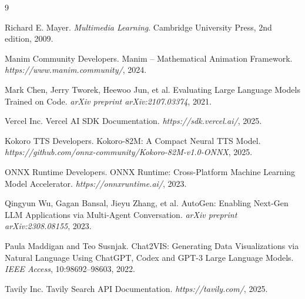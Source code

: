\documentclass[12pt,a4paper,twoside,openright]{report}
\begin{document}
\begin{thebibliography}{9}

Richard E. Mayer.
\emph{Multimedia Learning}.
Cambridge University Press, 2nd edition, 2009.

Manim Community Developers.
Manim -- Mathematical Animation Framework.
\emph{https://www.manim.community/}, 2024.

Mark Chen, Jerry Tworek, Heewoo Jun, et al.
Evaluating Large Language Models Trained on Code.
\emph{arXiv preprint arXiv:2107.03374}, 2021.

Vercel Inc.
Vercel AI SDK Documentation.
\emph{https://sdk.vercel.ai/}, 2025.

Kokoro TTS Developers.
Kokoro-82M: A Compact Neural TTS Model.
\emph{https://github.com/onnx-community/Kokoro-82M-v1.0-ONNX}, 2025.

ONNX Runtime Developers.
ONNX Runtime: Cross-Platform Machine Learning Model Accelerator.
\emph{https://onnxruntime.ai/}, 2023.

Qingyun Wu, Gagan Bansal, Jieyu Zhang, et al.
AutoGen: Enabling Next-Gen LLM Applications via Multi-Agent Conversation.
\emph{arXiv preprint arXiv:2308.08155}, 2023.

Paula Maddigan and Teo Susnjak.
Chat2VIS: Generating Data Visualizations via Natural Language
Using ChatGPT, Codex and GPT-3 Large Language Models.
\emph{IEEE Access}, 10:98692--98603, 2022.

Tavily Inc.
Tavily Search API Documentation.
\emph{https://tavily.com/}, 2025.

\end{thebibliography}
\end{document}
